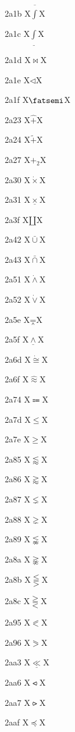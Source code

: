 \documentclass[11pt]{article}
\begin{document}
2a1b X{\ensuremath{\overline{\int}}}X

2a1c X{\ensuremath{\underline{\int}}}X

2a1d X{\ensuremath{\Join}}X

2a1e X{\ensuremath{\lhd}}X

2a1f X{\ensuremath{\fatsemi}}X

2a23 X{\ensuremath{\hat{+}}}X

2a24 X{\ensuremath{\tilde{+}}}X

2a27 X{\ensuremath{+_2}}X

2a30 X{\ensuremath{\dot{\times}}}X

2a31 X{\ensuremath{\underline{\times}}}X

2a3f X{\ensuremath{\amalg}}X

2a42 X{\ensuremath{\bar{\cup}}}X

2a43 X{\ensuremath{\bar{\cap}}}X

2a51 X{\ensuremath{\dot{\wedge}}}X

2a52 X{\ensuremath{\dot{\vee}}}X

2a5e X{\ensuremath{\doublebarwedge}}X

2a5f X{\ensuremath{\underline{\wedge}}}X

2a6d X{\ensuremath{\dot{\cong}}}X

2a6f X{\ensuremath{\hat{\approx}}}X

2a74 X{\ensuremath{\Coloneqq}}X

2a7d X{\ensuremath{\leqslant}}X

2a7e X{\ensuremath{\geqslant}}X

2a85 X{\ensuremath{\lessapprox}}X

2a86 X{\ensuremath{\gtrapprox}}X

2a87 X{\ensuremath{\lneq}}X

2a88 X{\ensuremath{\gneq}}X

2a89 X{\ensuremath{\lnapprox}}X

2a8a X{\ensuremath{\gnapprox}}X

2a8b X{\ensuremath{\lesseqqgtr}}X

2a8c X{\ensuremath{\gtreqqless}}X

2a95 X{\ensuremath{\eqslantless}}X

2a96 X{\ensuremath{\eqslantgtr}}X

2aa3 X{\ensuremath{\underline{\ll}}}X

2aa6 X{\ensuremath{\leftslice}}X

2aa7 X{\ensuremath{\rightslice}}X

2aaf X{\ensuremath{\preceq}}X
\end{document}
